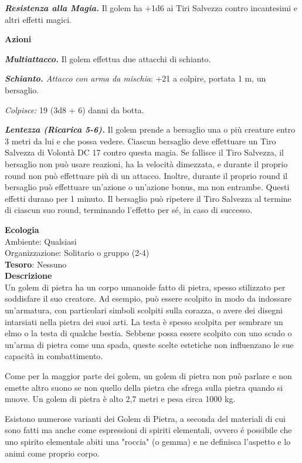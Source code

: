 \begin{multicols}{2}
	\textit{\textbf{Resistenza alla Magia.}} Il golem ha +1d6 ai Tiri Salvezza contro incantesimi e altri effetti magici.

	\textbf{Azioni}

	\textit{\textbf{Multiattacco.}} Il golem effettua due attacchi di schianto.

	\textit{\textbf{Schianto.} Attacco con arma da mischia}: +21 a colpire, portata 1 m, un bersaglio.

	\textit{Colpisce:} 19 (3d8 + 6) danni da botta.

	\textit{\textbf{Lentezza (Ricarica 5-6).}} Il golem prende a bersaglio una o più creature entro 3 metri da lui e che possa vedere. Ciascun bersaglio deve effettuare un Tiro Salvezza di Volontà DC 17 contro questa magia. Se fallisce il Tiro Salvezza, il bersaglio non può usare reazioni, ha la velocità dimezzata, e durante il proprio round non può effettuare più di un attacco. Inoltre, durante il proprio round il bersaglio può effettuare un'azione o un'azione bonus, ma non entrambe. Questi effetti durano per 1 minuto. Il bersaglio può ripetere il Tiro Salvezza al termine di ciascun suo round, terminando l'effetto per sé, in caso di successo.

	\textbf{Ecologia}\\
	Ambiente: Qualsiasi\\
	Organizzazione: Solitario o gruppo (2-4)\\
	\textbf{Tesoro}: Nessuno\\
	\textbf{Descrizione}\\
	Un golem di pietra ha un corpo umanoide fatto di pietra, spesso stilizzato per soddisfare il suo creatore. Ad esempio, può essere scolpito in modo da indossare un'armatura, con particolari simboli scolpiti sulla corazza, o avere dei disegni intarsiati nella pietra dei suoi arti. La testa è spesso scolpita per sembrare un elmo o la testa di qualche bestia. Sebbene possa essere scolpito con uno scudo o un'arma di pietra come una spada, queste scelte estetiche non influenzano le sue capacità in combattimento.

	Come per la maggior parte dei golem, un golem di pietra non può parlare e non emette altro suono se non quello della pietra che sfrega sulla pietra quando si muove. Un golem di pietra è alto 2,7 metri e pesa circa 1000 kg.

	Esistono numerose varianti dei Golem di Pietra, a seconda del materiali di cui sono fatti ma anche come espressioni di spiriti elementali, ovvero é possibile che uno spirito elementale abiti una "roccia" (o gemma) e ne definisca l'aspetto e lo animi come proprio corpo.


\end{multicols}
